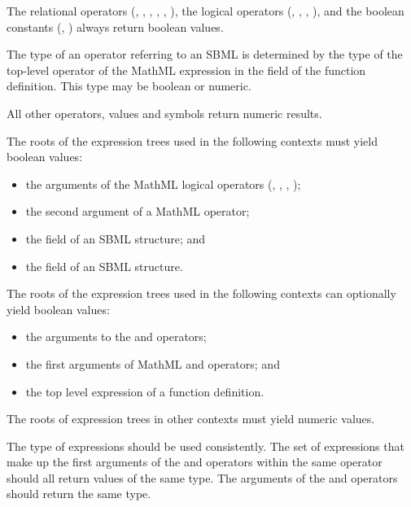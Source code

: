 The relational operators (, , ,
, , ), the logical operators
(, , , ), and the
boolean constants (, ) always return
boolean values.

The type of an operator referring to an SBML \FunctionDefinition
is determined by the type of the top-level operator of the MathML
expression in the  field of the function definition.
This type may be boolean or numeric.

All other operators, values and symbols return numeric results.

The roots of the expression trees used in the following contexts
must yield boolean values:
\begin{itemize}

\item the arguments of the MathML logical operators (,
, , );

\item the second argument of a MathML  operator;

\item the  field of an SBML \Event structure; and

\item the  field of an SBML \Constraint structure.

\end{itemize}

The roots of the expression trees used in the following contexts can
optionally yield boolean values:
\begin{itemize}

\item the arguments to the  and  operators;

\item the first arguments of MathML  and 
operators; and

\item the top level expression of a function definition.

\end{itemize}

The roots of expression trees in other contexts must yield numeric
values.

The type of expressions should be used consistently.  The set of
expressions that make up the first arguments of the 
and  operators within the same 
operator should all return values of the same type. The arguments
of the  and  operators should return the same
type.
